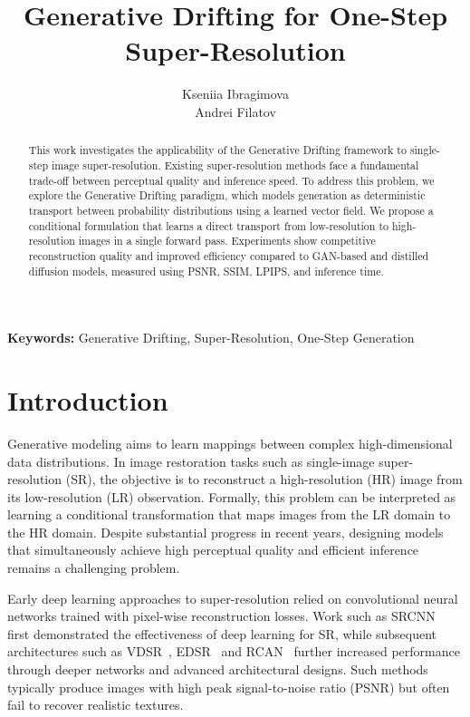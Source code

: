 \documentclass{article}
\title{Generative Drifting for One-Step Super-Resolution}
\author{
  Kseniia Ibragimova\\
  \And
  Andrei Filatov\\
}
\begin{document}
\maketitle

\begin{abstract}
    This work investigates the applicability of the Generative Drifting framework to single-step image super-resolution. Existing super-resolution methods face a fundamental trade-off between perceptual quality and inference speed. To address this problem, we explore the Generative Drifting paradigm, which models generation as deterministic transport between probability distributions using a learned vector field. We propose a conditional formulation that learns a direct transport from low-resolution to high-resolution images in a single forward pass. Experiments show competitive reconstruction quality and improved efficiency compared to GAN-based and distilled diffusion models, measured using PSNR, SSIM, LPIPS, and inference time.
\end{abstract}

\textbf{Keywords:} Generative Drifting, Super-Resolution, One-Step Generation

\section{Introduction}\label{sec:intro}


Generative modeling aims to learn mappings between complex high-dimensional data distributions. 
In image restoration tasks such as single-image super-resolution (SR), the objective is to reconstruct a high-resolution (HR) image from its low-resolution (LR) observation. 
Formally, this problem can be interpreted as learning a conditional transformation that maps images from the LR domain to the HR domain. 
Despite substantial progress in recent years, designing models that simultaneously achieve high perceptual quality and efficient inference remains a challenging problem.

Early deep learning approaches to super-resolution relied on convolutional neural networks trained with pixel-wise reconstruction losses. Work such as SRCNN~\cite{dong2015srcnn} first demonstrated the effectiveness of deep learning for SR, while subsequent architectures such as VDSR~\cite{kim2016vdsr}, EDSR~\cite{lim2017edsr} and RCAN~\cite{zhang2018rcan} further increased performance through deeper networks and advanced architectural designs. Such methods typically produce images with high peak signal-to-noise ratio (PSNR) but often fail to recover realistic textures. 
\end{document}
